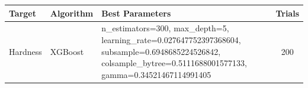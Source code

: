 \begin{tabular}{lp{2cm}p{10cm}c}
\toprule
Target & Algorithm & Best Parameters & Trials \\
\midrule
Hardness & XGBoost & n_estimators=300, max_depth=5, learning_rate=0.027647752397368604, subsample=0.6948685224526842, colsample_bytree=0.5111688001577133, gamma=0.34521467114991405 & 200 \\
\bottomrule
\end{tabular}
